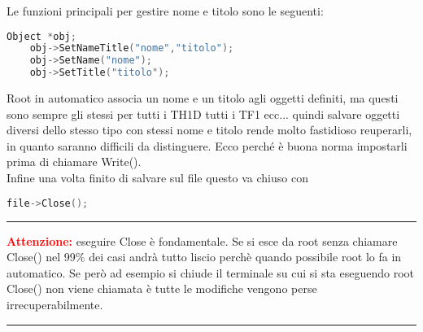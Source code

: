 Le funzioni principali per gestire nome e titolo sono le seguenti:
\begin{lstlisting}[language=C++,label={cod1},mathescape=true,breaklines=true]
	Object *obj;
	obj->SetNameTitle("nome","titolo");
	obj->SetName("nome");
	obj->SetTitle("titolo");
\end{lstlisting}
Root in automatico associa un nome e un titolo agli oggetti definiti, ma questi sono sempre gli stessi per tutti i TH1D tutti i TF1 ecc... quindi salvare oggetti diversi dello stesso tipo con stessi nome e titolo rende molto fastidioso reuperarli, in quanto saranno difficili da distinguere. Ecco perché è buona norma impostarli prima di chiamare Write().\\
Infine una volta finito di salvare sul file questo va chiuso con
\begin{lstlisting}[language=C++,label={cod1},mathescape=true,breaklines=true]
	file->Close();
\end{lstlisting}
{\color{red} \rule{\linewidth}{0.5mm}}
\textcolor{red}{\textbf{Attenzione:}} eseguire Close è fondamentale. Se si esce da root senza chiamare Close() nel 99\% dei casi andrà tutto liscio perchè quando possibile root lo fa in automatico. Se però ad esempio si chiude il terminale su cui si sta eseguendo root Close() non viene chiamata è tutte le modifiche vengono perse irrecuperabilmente.\\
{\color{red} \rule{\linewidth}{0.5mm}}

